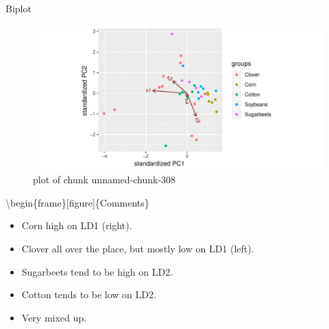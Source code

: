 \documentclass[ignorenonframetext,]{beamer}
\newenvironment{Shaded}{\begin{snugshade}}{\end{snugshade}}
\newcommand{\DataTypeTok}[1]{\textcolor[rgb]{0.13,0.29,0.53}{#1}}
\newcommand{\KeywordTok}[1]{\textcolor[rgb]{0.13,0.29,0.53}{\textbf{#1}}}
\newcommand{\NormalTok}[1]{#1}
\newcommand{\OperatorTok}[1]{\textcolor[rgb]{0.81,0.36,0.00}{\textbf{#1}}}
\begin{document}
\begin{frame}[fragile]{Biplot}
\protect\hypertarget{biplot-1}{}

\begin{Shaded}
\end{Shaded}

\begin{figure}
\centering
\includegraphics{figure/unnamed-chunk-308-1.pdf}
\caption{plot of chunk unnamed-chunk-308}
\end{figure}

\textbackslash{}begin\{frame\}{[}figure{]}\{Comments\}

\begin{itemize}
\item
  Corn high on LD1 (right).
\item
  Clover all over the place, but mostly low on LD1 (left).
\item
  Sugarbeets tend to be high on LD2.
\item
  Cotton tends to be low on LD2.
\item
  Very mixed up.
\end{itemize}

\end{frame}
\end{document}
